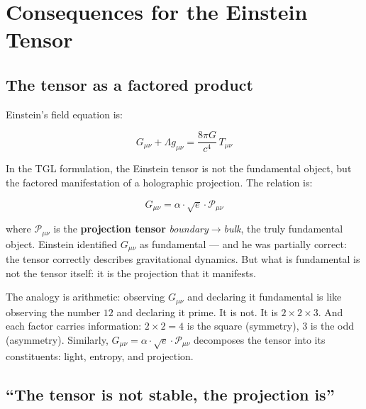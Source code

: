\documentclass[12pt,a4paper,twoside]{article}
\newcommand{\boundary}{\textit{boundary}}
\newcommand{\bulk}{\textit{bulk}}
\begin{document}

\section{Consequences for the Einstein Tensor}
\label{sec:tensor}

\subsection{The tensor as a factored product}

Einstein's field equation is:

\begin{equation}
G_{\mu\nu} + \Lambda g_{\mu\nu} = \frac{8\pi G}{c^4}\, T_{\mu\nu}
\label{eq:einstein}
\end{equation}

In the TGL formulation, the Einstein tensor is not the fundamental object, but the factored manifestation of a holographic projection. The relation is:

\begin{equationbox}[title={Factored Tensor}]
\begin{equation}
\boxed{G_{\mu\nu} = \alpha \cdot \sqrt{e} \cdot \mathcal{P}_{\mu\nu}}
\label{eq:tensor_fatorado}
\end{equation}
\end{equationbox}

\noindent where $\mathcal{P}_{\mu\nu}$ is the \textbf{projection tensor} \boundary$\to$\bulk, the truly fundamental object. Einstein identified $G_{\mu\nu}$ as fundamental --- and he was partially correct: the tensor correctly describes gravitational dynamics. But what is fundamental is not the tensor itself: it is the projection that it manifests.

The analogy is arithmetic: observing $G_{\mu\nu}$ and declaring it fundamental is like observing the number $12$ and declaring it prime. It is not. It is $2 \times 2 \times 3$. And each factor carries information: $2 \times 2 = 4$ is the square (symmetry), $3$ is the odd (asymmetry). Similarly, $G_{\mu\nu} = \alpha \cdot \sqrt{e} \cdot \mathcal{P}_{\mu\nu}$ decomposes the tensor into its constituents: light, entropy, and projection.

\subsection{``The tensor is not stable, the projection is''}
\end{document}
